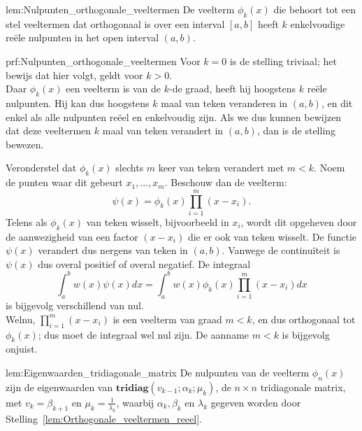 \begin{lem}{lem:Nulpunten_orthogonale_veeltermen}   
    De veelterm $\phi_k(x)$ die behoort tot een stel veeltermen dat orthogonaal is over een interval $[a,b]$ heeft $k$ enkelvoudige reële nulpunten in het open interval $(a,b)$.
\end{lem}

\begin{prf}{prf:Nulpunten_orthogonale_veeltermen}   
    Voor $k=0$ is de stelling triviaal; het bewijs dat hier volgt, geldt voor $k>0$. \\

    Daar $\phi_k(x)$ een veelterm is van de $k$-de graad, heeft hij hoogstens $k$ reële nulpunten. Hij kan dus hoogstens $k$ maal van teken veranderen in $(a,b)$, en dit enkel als alle nulpunten reëel en enkelvoudig zijn. Als we dus kunnen bewijzen dat deze veeltermen $k$ maal van teken verandert in $(a,b)$, dan is de stelling bewezen.

    Veronderstel dat $\phi_k(x)$ slechts $m$ keer van teken verandert met $m < k$. Noem de punten waar dit gebeurt $x_1,\dots,x_m$. Beschouw dan de veelterm:
    \begin{equation*}
        \psi(x) = \phi_k(x)\prod_{i=1}^{m}(x-x_i).
    \end{equation*}
    Telens als $\phi_k(x)$ van teken wisselt, bijvoorbeeld in $x_i$, wordt dit opgeheven door de aanwezigheid van een factor $(x-x_i)$ die er ook van teken wisselt. De functie $\psi(x)$ verandert dus nergens van teken in $(a,b)$. Vanwege de continuïteit is $\psi(x)$ dus overal positief of overal negatief. De integraal
    \begin{equation*}
        \int_{a}^{b}w(x)\psi(x)dx =  \int_{a}^{b}w(x)\phi_k(x)\prod_{i=1}^{m}(x-x_i)dx
    \end{equation*}
    is bijgevolg verschillend van nul. \\

    Welnu, $\prod_{i=1}^{m}(x-x_i)$ is een veelterm van graad $m<k$, en dus orthogonaal tot $\phi_k(x)$; dus moet de integraal wel nul zijn. De aanname $m < k$ is bijgevolg onjuist.
\end{prf}

\newpage

\begin{lem}{lem:Eigenwaarden_tridiagonale_matrix}   
    De nulpunten van de veelterm $\phi_n(x)$ zijn de eigenwaarden van $\textbf{tridiag}(v_{k-1};\alpha_k;\mu_k)$, de $n \times n$ tridiagonale matrix, met $v_k = \beta_{k+1}$ en $\mu_k = \frac{1}{\lambda_k}$, waarbij $\alpha_k, \beta_k$ en $\lambda_k$ gegeven worden door Stelling~\ref{lem:Orthogonale_veeltermen_reeel}.
    \vspace{-0.2cm}
\end{lem}


